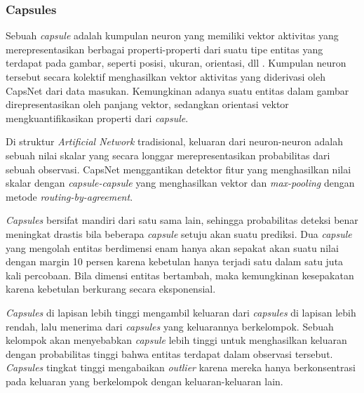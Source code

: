 \documentclass{article}
\begin{document}
	   	\subsubsection{Capsules}
	   	Sebuah \textit{capsule} adalah kumpulan neuron yang memiliki vektor aktivitas yang merepresentasikan berbagai properti-properti dari suatu tipe entitas yang terdapat pada gambar, seperti posisi, ukuran, orientasi, dll \cite{hinton}. Kumpulan neuron tersebut secara kolektif menghasilkan vektor aktivitas yang diderivasi oleh CapsNet dari data masukan. Kemungkinan adanya suatu entitas dalam gambar direpresentasikan oleh panjang vektor, sedangkan orientasi vektor mengkuantifikasikan properti dari \textit{capsule}. 
	   	\par
	   	Di struktur \textit{Artificial Network} tradisional, keluaran dari neuron-neuron adalah sebuah nilai skalar yang secara longgar merepresentasikan probabilitas dari sebuah observasi. CapsNet menggantikan detektor fitur yang menghasilkan nilai skalar dengan \textit{capsule-capsule} yang menghasilkan vektor dan \textit{max-pooling} dengan metode \textit{routing-by-agreement}. 
	   	\par
	   	\textit{Capsules} bersifat mandiri dari satu sama lain, sehingga probabilitas deteksi benar meningkat drastis bila beberapa \textit{capsule} setuju akan suatu prediksi. Dua \textit{capsule} yang mengolah entitas berdimensi enam hanya akan sepakat akan suatu nilai dengan margin 10 persen karena kebetulan hanya terjadi satu dalam satu juta kali percobaan. Bila dimensi entitas bertambah, maka kemungkinan kesepakatan karena kebetulan berkurang secara eksponensial. 
	   	\par
	   	\textit{Capsules} di lapisan lebih tinggi mengambil keluaran dari \textit{capsules} di lapisan lebih rendah, lalu menerima dari \textit{capsules} yang keluarannya berkelompok. Sebuah kelompok akan menyebabkan \textit{capsule} lebih tinggi untuk menghasilkan keluaran dengan probabilitas tinggi bahwa entitas terdapat dalam observasi tersebut. \textit{Capsules} tingkat tinggi mengabaikan \textit{outlier} karena mereka hanya berkonsentrasi pada keluaran yang berkelompok dengan keluaran-keluaran lain.
	   	
\end{document}
